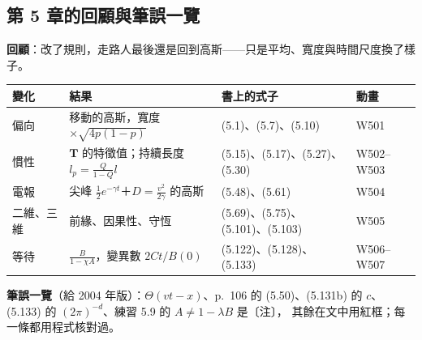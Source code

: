 \subsection{第 5 章的回顧與筆誤一覽}
\textbf{回顧}：改了規則，走路人最後還是回到高斯——只是平均、寬度與時間尺度換了樣子。
\begin{center}
\small\setlength{\tabcolsep}{4pt}
\begin{tabular}{@{}llll@{}}
\toprule
變化 & 結果 & 書上的式子 & 動畫\\
\midrule
偏向 & 移動的高斯，寬度 $\times\sqrt{4p(1-p)}$ & (5.1)、(5.7)、(5.10) & W501\\
慣性 & $\mathbf T$ 的特徵值；持續長度 $l_p=\frac{Q}{1-Q}l$ & (5.15)、(5.17)、(5.27)、(5.30) & W502--W503\\
電報 & 尖峰 $\frac12e^{-\gamma t}$＋$D=\frac{v^2}{2\gamma}$ 的高斯 & (5.48)、(5.61) & W504\\
二維、三維 & 前緣、因果性、守恆 & (5.69)、(5.75)、(5.101)、(5.103) & W505\\
等待 & $\frac{B}{1-\chi A}$，變異數 $2Ct/B(0)$ & (5.122)、(5.128)、(5.133) & W506--W507\\
\bottomrule
\end{tabular}
\end{center}
\textbf{筆誤一覽}（給 2004 年版）：$\Theta(vt-x)$、p.~106 的 (5.50)、(5.131b) 的 $c$、(5.133) 的 $(2\pi)^{-d}$、練習 5.9 的 $A\ne1-\lambda B$ 是〔注〕，
其餘在文中用紅框；每一條都用程式核對過。
\begin{center}
\footnotesize
\FiveTabErrata
\end{center}
